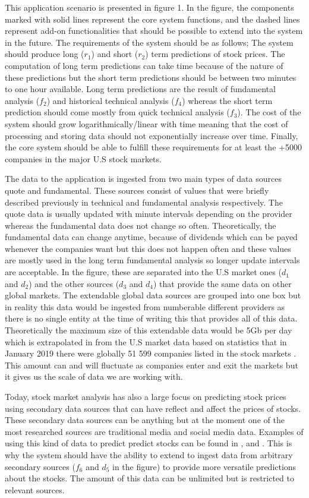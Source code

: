 \documentclass[article,11pt]{article}
\begin{document}
This application scenario is presented in figure 1.
In the figure, the components marked with solid lines represent the core system functions, and the dashed lines represent add-on functionalities that should be possible to extend into the system in the future.
The requirements of the system should be as follows;
The system should produce long ($r_1$) and short ($r_2$) term predictions of stock prices.
The computation of long term predictions can take time because of the nature of these predictions but the short term predictions should be between two minutes to one hour available.
Long term predictions are the result of fundamental analysis ($f_2$) and historical technical analysis ($f_4$) whereas the short term prediction should come mostly from quick technical analysis ($f_3$).
The cost of the system should grow logarithmically/linear with time meaning that the cost of processing and storing data should not exponentially increase over time.
Finally, the core system should be able to fulfill these requirements for at least the +5000 companies in the major U.S stock markets.

The data to the application is ingested from two main types of data sources quote and fundamental.
These sources consist of values that were briefly described previously in technical and fundamental analysis respectively.
The quote data is usually updated with minute intervals depending on the provider whereas the fundamental data does not change so often.
Theoretically, the fundamental data can change anytime, because of dividends which can be payed whenever the companies want but this does not happen often and these values are mostly used in the long term fundamental analysis so longer update intervals are acceptable.
In the figure, these are separated into the U.S market ones ($d_1$ and $d_2$) and the other sources ($d_3$ and $d_4$) that provide the same data on other global markets.
The extendable global data sources are grouped into one box but in reality this data would be ingested from numberable different providers as there is no single entity at the time of writing this that provides all of this data.
Theoretically the maximum size of this extendable data would be 5Gb per day which is extrapolated in from the U.S market data based on statistics that in January 2019 there were globally 51 599 companies listed in the stock markets \cite{global}.
This amount can and will fluctuate as companies enter and exit the markets but it gives us the scale of data we are working with.

Today, stock market analysis has also a large focus on predicting stock prices using secondary data sources that can have reflect and affect the prices of stocks. 
These secondary data sources can be anything but at the moment one of the most researched sources are traditional media and social media data.
Examples of using this kind of data to predict predict stocks can be found in \cite{kao}, \cite{skuza} and \cite{wai}.
This is why the system should have the ability to extend to ingest data from arbitrary secondary sources ($f_6$ and $d_5$ in the figure) to provide more versatile predictions about the stocks.
The amount of this data can be unlimited but is restricted to relevant sources.
\end{document}
